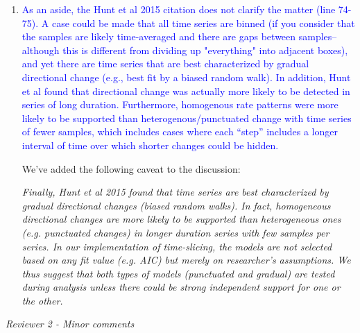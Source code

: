 \documentclass[12pt,letterpaper]{article}
\renewcommand{\subsection}[1]{%
\bigskip
\begin{center}
\begin{large}
\normalfont\itshape #1
\end{large}
\end{center}}
\begin{document}
\begin{enumerate}

\item{\textcolor{blue}{As an aside, the Hunt et al 2015 citation does not clarify the matter (line 74-75). A case could be made that all time series are binned (if you consider that the samples are likely time-averaged and there are gaps between samples--although this is different from dividing up "everything" into adjacent boxes), and yet there are time series that are best characterized by gradual directional change (e.g., best fit by a biased random walk). In addition, Hunt et al found that directional change was actually more likely to be detected in series of long duration. Furthermore, homogenous rate patterns were more likely to be supported than heterogenous/punctuated change with time series of fewer samples, which includes cases where each ``step'' includes a longer interval of time over which shorter changes could be hidden.}}


We've added the following caveat to the discussion:

\textit{Finally, Hunt et al 2015 found that time series are best characterized by gradual directional changes (biased random walks).
In fact, homogeneous directional changes are more likely to be supported than heterogeneous ones (e.g. punctuated changes) in longer duration series with few samples per series.
In our implementation of time-slicing, the models are not selected based on any fit value (e.g. AIC) but merely on researcher's assumptions.
We thus suggest that both types of models (punctuated and gradual) are tested during analysis unless there could be strong independent support for one or the other.}


\end{enumerate}

\subsection{Reviewer 2 - Minor comments}
\end{document}
